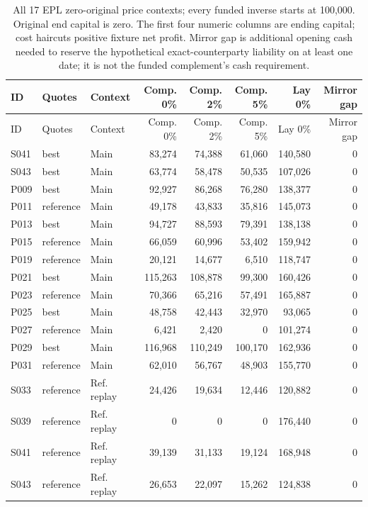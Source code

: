 \begin{longtable}{lllrrrrr}
\caption{All 17 EPL zero-original price contexts; every funded inverse starts at 100,000. Original end capital is zero. The first four numeric columns are ending capital; cost haircuts positive fixture net profit. Mirror gap is additional opening cash needed to reserve the hypothetical exact-counterparty liability on at least one date; it is not the funded complement's cash requirement.}\label{tab:all_zero_contexts}\\
\toprule
ID & Quotes & Context & Comp. 0\% & Comp. 2\% & Comp. 5\% & Lay 0\% & Mirror gap \\ \midrule
\endfirsthead
\toprule
ID & Quotes & Context & Comp. 0\% & Comp. 2\% & Comp. 5\% & Lay 0\% & Mirror gap \\ \midrule
\endhead
\bottomrule
\endfoot
S041 & best & Main & 83,274 & 74,388 & 61,060 & 140,580 & 0 \\
S043 & best & Main & 63,774 & 58,478 & 50,535 & 107,026 & 0 \\
P009 & best & Main & 92,927 & 86,268 & 76,280 & 138,377 & 0 \\
P011 & reference & Main & 49,178 & 43,833 & 35,816 & 145,073 & 0 \\
P013 & best & Main & 94,727 & 88,593 & 79,391 & 138,138 & 0 \\
P015 & reference & Main & 66,059 & 60,996 & 53,402 & 159,942 & 0 \\
P019 & reference & Main & 20,121 & 14,677 & 6,510 & 118,747 & 0 \\
P021 & best & Main & 115,263 & 108,878 & 99,300 & 160,426 & 0 \\
P023 & reference & Main & 70,366 & 65,216 & 57,491 & 165,887 & 0 \\
P025 & best & Main & 48,758 & 42,443 & 32,970 & 93,065 & 0 \\
P027 & reference & Main & 6,421 & 2,420 & 0 & 101,274 & 0 \\
P029 & best & Main & 116,968 & 110,249 & 100,170 & 162,936 & 0 \\
P031 & reference & Main & 62,010 & 56,767 & 48,903 & 155,770 & 0 \\
S033 & reference & Ref. replay & 24,426 & 19,634 & 12,446 & 120,882 & 0 \\
S039 & reference & Ref. replay & 0 & 0 & 0 & 176,440 & 0 \\
S041 & reference & Ref. replay & 39,139 & 31,133 & 19,124 & 168,948 & 0 \\
S043 & reference & Ref. replay & 26,653 & 22,097 & 15,262 & 124,838 & 0 \\
\end{longtable}
